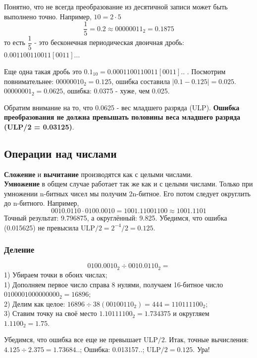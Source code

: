 \documentclass[12pt]{article}
\begin{document}
Понятно, что не всегда преобразование из десятичной записи может быть выполнено точно. Например, $ 10 = 2\cdot 5 $ 
$$ \dfrac{1}{5} = 0.2 \approx 00000011_{2} = 0.1875$$ 
то есть $\dfrac{1}{5}$ - это бесконечная периодическая двоичная дробь: $0.001100110011[0011]..$. 

Еще одна такая дробь это $0.1_{10} = 0.0001100110011[0011]..$ . Посмотрим повнимательнее: $00000010_{2} = 0.125$, ошибка составила $|0.1 - 0.125| = 0.025.$ \\
$00000001_{2}= 0.0625$, ошибка: 0.0375 - хуже, чем 0.025. 

Обратим внимание на то, что 0.0625 - вес младшего разряда (ULP). \textbf{Ошибка преобразования не должна превышать половины веса младшего разряда (ULP/2 = 0.03125)}.

\subsection{Операции над числами}

\textbf{Сложение} и \textbf{вычитание} производятся как с целыми числами. \\
\textbf{Умножение} в общем случае работает так же как и с целыми числами. Только при умножении n-битных чисел мы получим 2n-битное. Его потом следует округлить до n-битного. Например, \\
$$ 0010.0110 \cdot 0100.0010 = 1001.11001100\approx 1001.1101 $$
Точный результат: 9.796875, а округлённый: 9.825. Убедимся, что ошибка (0.015625) не превысила $\text{ULP}/2 = 2^{-4}/2 = 0.125$.

\subsubsection*{Деление}
$$0100.0010_{2} \div 0010.0110_{2}=$$
1) Убираем точки в обоих числах; \\
1) Дополняем первое число справа 8 нулями, получаем 16-битное число $0100001000000000_{2} = 16896$; \\
2) Делим как целое: $16896 \div 38(00100110_{2}) = 444 = 110111100_{2}$; \\
3) Ставим точку на своё место $1.10111100_{2} = 1.734375$ и округляем $1.1100_{2} = 1.75$. 

Убедимся, что ошибка все еще не превышает  $\text{ULP}/2$. Итак, точные вычисления: $4.125 \div 2.375 = 1.73684..$; Ошибка: 0.013157..; $ \text{ULP}/2 = 0.125$. Ура!
\end{document}
